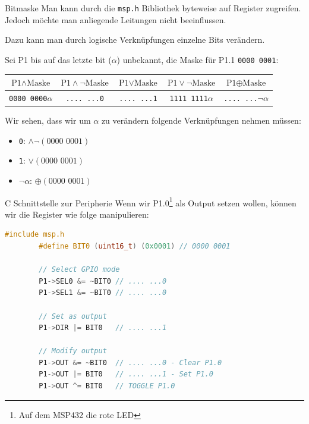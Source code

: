 \begin{bonus}{Bitmaske}
    Man kann durch die \texttt{msp.h} Bibliothek byteweise auf Register zugreifen.
    Jedoch möchte man anliegende Leitungen nicht beeinflussen.

    Dazu kann man durch logische Verknüpfungen einzelne Bits verändern.

    Sei P1 bis auf das letzte bit (\texttt{$\alpha$}) unbekannt, die Maske für P1.1 \texttt{0000 0001}:

    \begin{center}
        \begin{tabular}{|c|c|c|c|c|}
            \hline
            $\text{P1} \land \text{Maske}$ & $\text{P1} \land \lnot \text{Maske}$ & $\text{P1} \lor \text{Maske}$ & $\text{P1} \lor \lnot \text{Maske}$ & $\text{P1} \oplus \text{Maske}$ \\\hline\hline
            \texttt{0000 0000$\alpha$}     & \texttt{.... ...0}                   & \texttt{.... ...1}            & \texttt{1111 1111$\alpha$}          & \texttt{.... ...$\lnot \alpha$} \\\hline
        \end{tabular}
    \end{center}

    Wir sehen, dass wir um $\alpha$ zu verändern folgende Verknüpfungen nehmen müssen:
    \begin{itemize}
        \item \texttt{0}: $\land \lnot (\text{0000 0001})$
        \item \texttt{1}: $\lor (\text{0000 0001})$
        \item \texttt{$\lnot \alpha$}: $\oplus (\text{0000 0001})$
    \end{itemize}
\end{bonus}

\begin{example}{C Schnittstelle zur Peripherie}
    Wenn wir P1.0\footnote{Auf dem MSP432 die rote LED} als Output setzen wollen, können wir die Register wie folge manipulieren:

    \begin{lstlisting}[language=c]
        #include msp.h
        #define BIT0 (uint16_t) (0x0001) // 0000 0001

        // Select GPIO mode
        P1->SEL0 &= ~BIT0 // .... ...0
        P1->SEL1 &= ~BIT0 // .... ...0

        // Set as output
        P1->DIR |= BIT0   // .... ...1

        // Modify output
        P1->OUT &= ~BIT0  // .... ...0 - Clear P1.0
        P1->OUT |= BIT0   // .... ...1 - Set P1.0
        P1->OUT ^= BIT0   // TOGGLE P1.0
    \end{lstlisting}
\end{example}

